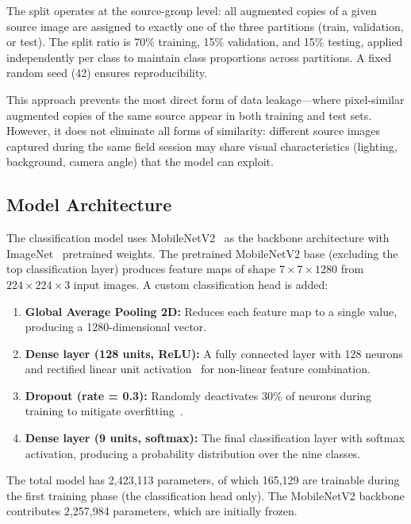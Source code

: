 \documentclass[conference]{IEEEtran}
\begin{document}
The split operates at the source-group level: all augmented copies of a given source image are assigned to exactly one of the three partitions (train, validation, or test). The split ratio is 70\% training, 15\% validation, and 15\% testing, applied independently per class to maintain class proportions across partitions. A fixed random seed (42) ensures reproducibility.

This approach prevents the most direct form of data leakage---where pixel-similar augmented copies of the same source appear in both training and test sets. However, it does not eliminate all forms of similarity: different source images captured during the same field session may share visual characteristics (lighting, background, camera angle) that the model can exploit.

\subsection{Model Architecture}

The classification model uses MobileNetV2~\cite{sandler2018} as the backbone architecture with ImageNet~\cite{russakovsky2015} pretrained weights. The pretrained MobileNetV2 base (excluding the top classification layer) produces feature maps of shape $7 \times 7 \times 1280$ from $224 \times 224 \times 3$ input images. A custom classification head is added:

\begin{enumerate}
    \item \textbf{Global Average Pooling 2D:} Reduces each feature map to a single value, producing a 1280-dimensional vector.
    \item \textbf{Dense layer (128 units, ReLU):} A fully connected layer with 128 neurons and rectified linear unit activation~\cite{nair2010} for non-linear feature combination.
    \item \textbf{Dropout (rate = 0.3):} Randomly deactivates 30\% of neurons during training to mitigate overfitting~\cite{srivastava2014}.
    \item \textbf{Dense layer (9 units, softmax):} The final classification layer with softmax activation, producing a probability distribution over the nine classes.
\end{enumerate}

The total model has 2{,}423{,}113 parameters, of which 165{,}129 are trainable during the first training phase (the classification head only). The MobileNetV2 backbone contributes 2{,}257{,}984 parameters, which are initially frozen.
\end{document}
